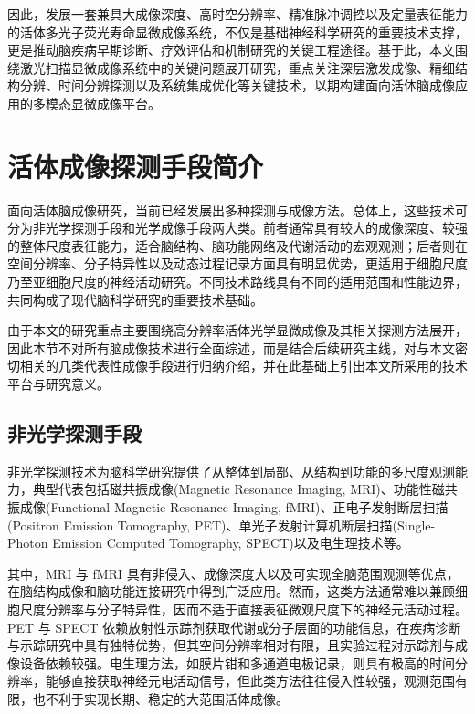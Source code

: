 因此，发展一套兼具大成像深度、高时空分辨率、精准脉冲调控以及定量表征能力的活体多光子荧光寿命显微成像系统，不仅是基础神经科学研究的重要技术支撑，更是推动脑疾病早期诊断、疗效评估和机制研究的关键工程途径。基于此，本文围绕激光扫描显微成像系统中的关键问题展开研究，重点关注深层激发成像、精细结构分辨、时间分辨探测以及系统集成优化等关键技术，以期构建面向活体脑成像应用的多模态显微成像平台。


\section{活体成像探测手段简介}\label{1.2}

面向活体脑成像研究，当前已经发展出多种探测与成像方法。总体上，这些技术可分为非光学探测手段和光学成像手段两大类。前者通常具有较大的成像深度、较强的整体尺度表征能力，适合脑结构、脑功能网络及代谢活动的宏观观测；后者则在空间分辨率、分子特异性以及动态过程记录方面具有明显优势，更适用于细胞尺度乃至亚细胞尺度的神经活动研究。不同技术路线具有不同的适用范围和性能边界，共同构成了现代脑科学研究的重要技术基础。

由于本文的研究重点主要围绕高分辨率活体光学显微成像及其相关探测方法展开，因此本节不对所有脑成像技术进行全面综述，而是结合后续研究主线，对与本文密切相关的几类代表性成像手段进行归纳介绍，并在此基础上引出本文所采用的技术平台与研究意义。

\subsection{非光学探测手段}\label{1.2.1}

非光学探测技术为脑科学研究提供了从整体到局部、从结构到功能的多尺度观测能力，典型代表包括磁共振成像(Magnetic Resonance Imaging, MRI)\cite{RN2107}、功能性磁共振成像(Functional Magnetic Resonance Imaging, fMRI)\cite{RN2006}、正电子发射断层扫描(Positron Emission Tomography, PET)\cite{RN2008}、单光子发射计算机断层扫描(Single-Photon Emission Computed Tomography, SPECT)以及电生理技术\cite{RN2011}等。

其中，MRI 与 fMRI 具有非侵入、成像深度大以及可实现全脑范围观测等优点，在脑结构成像和脑功能连接研究中得到广泛应用。然而，这类方法通常难以兼顾细胞尺度分辨率与分子特异性，因而不适于直接表征微观尺度下的神经元活动过程。PET 与 SPECT 依赖放射性示踪剂获取代谢或分子层面的功能信息，在疾病诊断与示踪研究中具有独特优势，但其空间分辨率相对有限，且实验过程对示踪剂与成像设备依赖较强。电生理方法，如膜片钳和多通道电极记录，则具有极高的时间分辨率，能够直接获取神经元电活动信号，但此类方法往往侵入性较强，观测范围有限，也不利于实现长期、稳定的大范围活体成像。


